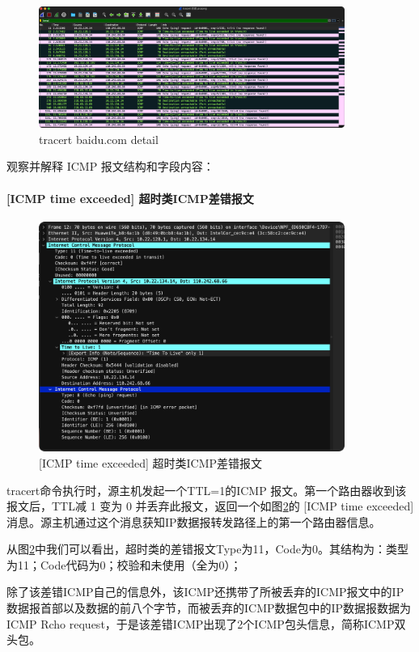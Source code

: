 \documentclass[a4paper,12pt]{report}
\begin{document}
\begin{spacing}{1.5}
\begin{figure}[htb!]
  \centering
\includegraphics[width=10cm]{figure/tracert-wrong.png}
\caption{tracert baidu.com detail}
\label{pic:tracertwrong}
\end{figure}
观察并解释 ICMP 报文结构和字段内容：

\paragraph*{[ICMP time exceeded] 超时类ICMP差错报文}

\begin{figure}[htb!]
  \centering
\includegraphics[width=10cm]{figure/ttl.png}
\caption{[ICMP time exceeded] 超时类ICMP差错报文}
\label{pic:ttl}
\end{figure}

tracert命令执行时，源主机发起一个TTL=1的ICMP 报文。第一个路由器收到该报文后，TTL减 1 变为 0 并丢弃此报文，返回一个如图\ref{pic:ttl}的 [ICMP time exceeded] 消息。源主机通过这个消息获知IP数据报转发路径上的第一个路由器信息。

从图\ref{pic:ttl}中我们可以看出，超时类的差错报文Type为11，Code为0。其结构为：类型为11；Code代码为0；校验和未使用（全为0）；

除了该差错ICMP自己的信息外，该ICMP还携带了所被丢弃的ICMP报文中的IP数据报首部以及数据的前八个字节，而被丢弃的ICMP数据包中的IP数据报数据为ICMP Rcho request，于是该差错ICMP出现了2个ICMP包头信息，简称ICMP双头包。


\end{spacing}
\end{document}
